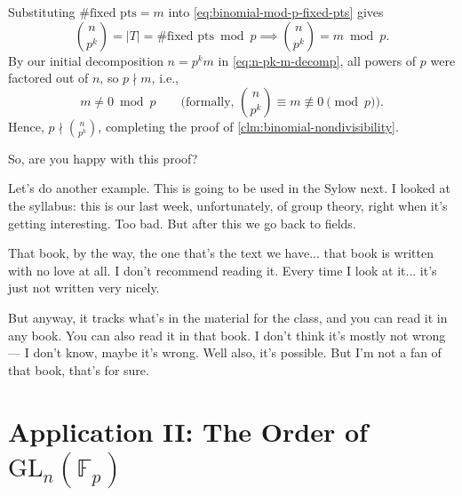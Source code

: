 \begin{proofWrapper}
\begin{content}
Substituting $\#\text{fixed pts} = m$ into \eqref{eq:binomial-mod-p-fixed-pts} gives
\[
\binom{n}{p^k} = |T| = \#\text{fixed pts} \bmod p \implies \binom{n}{p^k} = m \bmod p.
\]
By our initial decomposition $n = p^k m$ in \eqref{eq:n-pk-m-decomp}, all powers of $p$ were factored out of $n$, so $p \nmid m$, i.e.,
\[
m \neq 0 \bmod p \qquad \bigl(\text{formally, } \binom{n}{p^k} \equiv m \not\equiv 0 \pmod{p}\bigr).
\]
Hence, $p \nmid \binom{n}{p^k}$, completing the proof of \cref{clm:binomial-nondivisibility}.
\end{content}
\end{proofWrapper}

\begin{speech}[01:07:04 - 01:08:04]
So, are you happy with this proof?

Let's do another example. This is going to be used in the Sylow next. I looked at the syllabus: this is our last week, unfortunately, of group theory, right when it's getting interesting. Too bad. But after this we go back to fields.

That book, by the way, the one that's the text we have... that book is written with no love at all. I don't recommend reading it. Every time I look at it... it's just not written very nicely.

But anyway, it tracks what's in the material for the class, and you can read it in any book. You can also read it in that book. I don't think it's mostly not wrong --- I don't know, maybe it's wrong. Well also, it's possible. But I'm not a fan of that book, that's for sure.
\end{speech}

\begin{hidden}
\end{hidden}

\section{Application II: The Order of \texorpdfstring{$\mathrm{GL}_n(\mathbb{F}_p)$}{GL\_n(F\_p)}}

